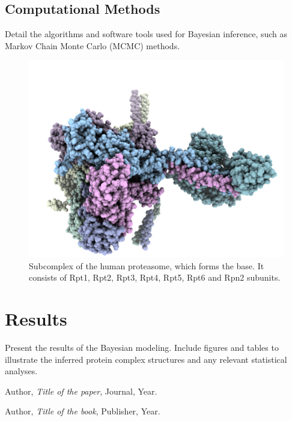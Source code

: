 \documentclass{report}
\begin{document}
\section{Computational Methods}
Detail the algorithms and software tools used for Bayesian inference, such as Markov Chain Monte Carlo (MCMC) methods.
\begin{figure}[ht!]
    \includegraphics[width=\textwidth]{./figures/base_proteasome_5gjr.png}
    \caption{Subcomplex of the human proteasome, which forms the base. It consists of 
    Rpt1, Rpt2, Rpt3, Rpt4, Rpt5, Rpt6 and Rpn2 subunits.}
\end{figure}
\chapter{Results}
\label{chap:results}
Present the results of the Bayesian modeling. Include figures and tables to illustrate the inferred protein complex structures and any relevant statistical analyses.

\begin{thebibliography}{9}
    Author, \textit{Title of the paper}, Journal, Year.

    Author, \textit{Title of the book}, Publisher, Year.
\end{thebibliography}
\end{document}
